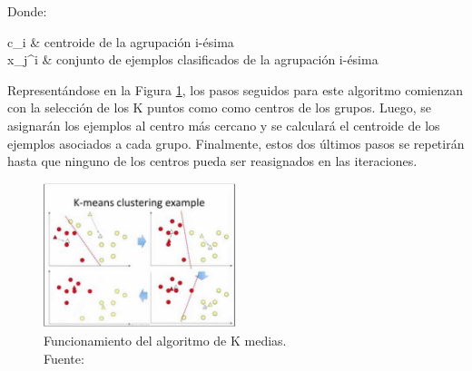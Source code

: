 \begin{itemize}
	Donde:
	\begin{conditions}
		c_i   &  centroide de la agrupación i-ésima \\
		x_j^i   &  conjunto de ejemplos clasificados de la agrupación i-ésima
	\end{conditions}
	
	Representándose en la Figura \ref{2:fig3}, los pasos seguidos para este algoritmo comienzan con la selección de los K puntos como como centros de los grupos. Luego, se asignarán los ejemplos al centro más cercano y se calculará el centroide de los ejemplos asociados a cada grupo. Finalmente, estos dos últimos pasos se repetirán hasta que ninguno de los centros pueda ser reasignados en las iteraciones.
	\begin{figure}[h]
		\begin{center}
			\includegraphics[width=0.50\textwidth]{2/figures/kmeans.jpg}
			\caption[Funcionamiento del algoritmo de K medias]{Funcionamiento del algoritmo de K medias.\\
			Fuente: \cite{tec_sancho2018supnosup}}
			\label{2:fig3}
		\end{center}
	\end{figure}
		

\end{itemize}
